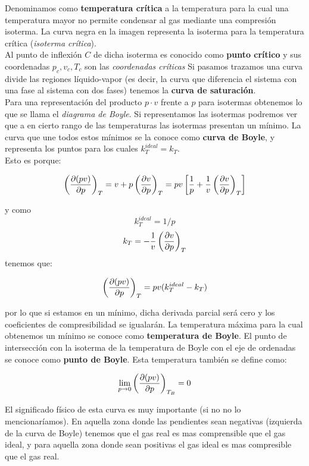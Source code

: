 \documentclass[12pt,a4paper,oneside]{book}
\begin{document}
Denominamos como \textbf{temperatura crítica} a la temperatura para la cual una temperatura mayor no permite condensar al gas mediante una compresión isoterma. La curva negra en la imagen representa la isoterma para la temperatura crítica (\textit{isoterma crítica}).\\


 Al punto de inflexión $C$ de dicha isoterma es conocido como \textbf{punto crítico} y sus coordenadas $p_c,v_c,T_c$ son las \textit{coordenadas críticas} Si pasamos trazamos una curva divide las regiones líquido-vapor (es decir, la curva que diferencia el sistema con una fase al sistema con dos fases) tenemos la \textbf{curva de saturación}. \\

Para una representación del producto $p \cdot v$ frente a $p$ para isotermas obtenemos lo que se llama el \textit{diagrama de Boyle}. Si representamos las isotermas podremos ver que a en cierto rango de las temperaturas las isotermas presentan un mínimo. La curva que une todos estos mínimos se la conoce como \textbf{curva de Boyle}, y representa los puntos para los cuales $k_T^{ideal} = k_T$. \\
 
Esto es porque:

$$ \left( \frac{\partial (pv)}{\partial p} \right)_T  = v + p \left( \frac{\partial v}{\partial p} \right)_T = pv \left[ \dfrac{1}{p} + \dfrac{1}{v} \left( \frac{\partial v}{\partial p} \right)_T \right] $$

y como $$k_T^{ideal}=1/p$$ $$k_T = - \frac{1}{v} \left( \frac{\partial v}{\partial p} \right)_T$$ tenemos que:

\begin{equation}
\left( \frac{\partial (pv)}{\partial p} \right)_T   = pv(k_T^{ideal} - k_T)
\end{equation}

por lo que si estamos en un mínimo, dicha derivada parcial será cero y los coeficientes de compresibilidad se igualarán. La temperatura máxima para la cual obtenemos un mínimo se conoce como \textbf{temperatura de Boyle}. El punto de intersección con la isoterma de la temperatura de Boyle con el eje de ordenadas se conoce como \textbf{punto de Boyle}. Esta temperatura también se define como:

\begin{equation}
\lim_{p \rightarrow 0} \left( \frac{\partial (pv)}{\partial p} \right)_{T_B} = 0
\end{equation}

El significado físico de esta curva es muy importante (si no no lo mencionaríamos). En aquella zona donde las pendientes sean negativas (izquierda de la curva de Boyle) tenemos que el gas real es mas comprensible que el gas ideal, y para aquella zona donde sean positivas el gas ideal es mas compresible que el gas real.
\end{document}
